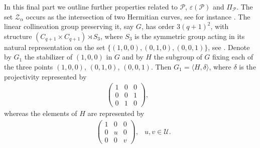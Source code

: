\documentclass[11pt]{article}
\theoremstyle{definition}
\numberwithin{equation}{section}
\def\eps{\varepsilon}
\def\cL{\mathcal L}
\def\cP{\mathcal P}
\def\cU{\mathcal U}
\def\cZ{\mathcal Z}
\begin{document}
In this final part we outline further properties related to $\cP$, $\eps(\cP)$ and $\Pi_{\cP}$. 
The set $\cZ_\alpha$ occurs as the intersection of two Hermitian curves, see for instance \cite{giuzzi2001collineation}. The linear collineation group preserving it, say $G$, has order $3(q+1)^2$, with structure $\left(C_{q+1} \times C_{q+1}\right) \rtimes S_3$, where $S_3$ is the symmetric group acting in its natural representation on the set $\{(1,0,0), (0,1,0), (0,0,1)\}$, see \cite[Theorem 2.3]{giuzzi2001collineation}. Denote by $G_1$ the stabilizer of $(1,0,0)$ in $G$ and by $H$ the subgroup of $G$ fixing each of the three points $(1,0,0)$, $(0,1,0)$, $(0,0,1)$. Then $G_1 = \langle H, \delta \rangle$, where $\delta$ is the projectivity represented by 
\begin{align*}
    \begin{pmatrix}
        1 & 0 & 0 \\
        0 & 0 & 1 \\
        0 & 1 & 0
    \end{pmatrix}, &
\end{align*}
whereas the elements of $H$ are represented by 
\begin{align}
    & \begin{pmatrix}
        1 & 0 & 0 \\
        0 & u & 0 \\
        0 & 0 & v
    \end{pmatrix}, & u,v \in \cU. \label{mat1}
\end{align}
\end{document}
